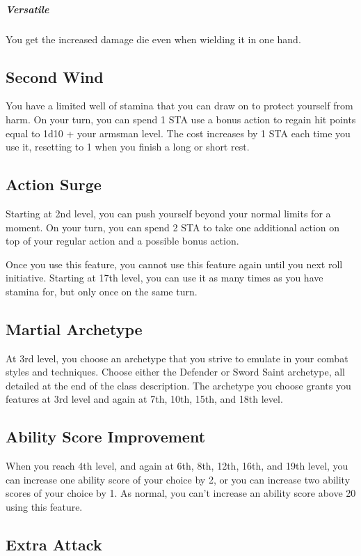 \subparagraph*{Versatile} You get the increased damage die even when wielding it in one hand.

\subsection{Second Wind}

You have a limited well of stamina that you can draw on to protect yourself from harm. On your turn, you can spend 1 STA use a bonus action to regain hit points equal to 1d10 + your armsman level. The cost increases by 1 STA each time you use it, resetting to 1 when you finish a long or short rest.

\subsection{Action Surge}

Starting at 2nd level, you can push yourself beyond your normal limits for a moment. On your turn, you can spend 2 STA to take one additional action on top of your regular action and a possible bonus action.

Once you use this feature, you cannot use this feature again until you next roll initiative. Starting at 17th level, you can use it as many times as you have stamina for, but only once on the same turn.

\subsection{Martial Archetype}

At 3rd level, you choose an archetype that you strive to emulate in your combat styles and techniques. Choose either the Defender or Sword Saint archetype, all detailed at the end of the class description. The archetype you choose grants you features at 3rd level and again at 7th, 10th, 15th, and 18th level.

\subsection{Ability Score Improvement}

When you reach 4th level, and again at 6th, 8th, 12th, 16th, and 19th level, you can increase one ability score of your choice by 2, or you can increase two ability scores of your choice by 1. As normal, you can't increase an ability score above 20 using this feature.

\subsection{Extra Attack}

